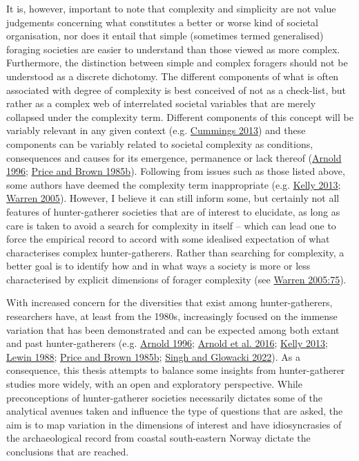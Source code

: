 \documentclass[
  12pt,
  a4paper,
  oneside]{book}
\begin{document}
It is, however, important to note that complexity and simplicity are not value judgements concerning what constitutes a \textquotesingle better\textquotesingle{} or \textquotesingle worse\textquotesingle{} kind of societal organisation, nor does it entail that simple (sometimes termed generalised) foraging societies are easier to understand than those viewed as more complex. Furthermore, the distinction between simple and complex foragers should not be understood as a discrete dichotomy. The different components of what is often associated with degree of complexity is best conceived of not as a check-list, but rather as a complex web of interrelated societal variables that are merely collapsed under the complexity term. Different components of this concept will be variably relevant in any given context (e.g. \protect\hyperlink{ref-cummings2013}{Cummings 2013}) and these components can be variably related to societal complexity as conditions, consequences and causes for its emergence, permanence or lack thereof (\protect\hyperlink{ref-arnold1996}{Arnold 1996}; \protect\hyperlink{ref-price1985a}{Price and Brown 1985b}). Following from issues such as those listed above, some authors have deemed the complexity term inappropriate (e.g. \protect\hyperlink{ref-kelly2013}{Kelly 2013}; \protect\hyperlink{ref-warren2005}{Warren 2005}). However, I believe it can still inform some, but certainly not all features of hunter-gatherer societies that are of interest to elucidate, as long as care is taken to avoid a search for complexity in itself -- which can lead one to force the empirical record to accord with some idealised expectation of what characterises complex hunter-gatherers. Rather than searching for complexity, a better goal is to identify how and in what ways a society is more or less characterised by explicit dimensions of forager complexity (see \protect\hyperlink{ref-warren2005}{Warren 2005:75}).

With increased concern for the diversities that exist among hunter-gatherers, researchers have, at least from the 1980s, increasingly focused on the immense variation that has been demonstrated and can be expected among both extant and past hunter-gatherers (e.g. \protect\hyperlink{ref-arnold1996}{Arnold 1996}; \protect\hyperlink{ref-arnold2016}{Arnold et al. 2016}; \protect\hyperlink{ref-kelly2013}{Kelly 2013}; \protect\hyperlink{ref-lewin1988}{Lewin 1988}; \protect\hyperlink{ref-price1985a}{Price and Brown 1985b}; \protect\hyperlink{ref-singh2022}{Singh and Glowacki 2022}). As a consequence, this thesis attempts to balance some insights from hunter-gatherer studies more widely, with an open and exploratory perspective. While preconceptions of hunter-gatherer societies necessarily dictates some of the analytical avenues taken and influence the type of questions that are asked, the aim is to map variation in the dimensions of interest and have idiosyncrasies of the archaeological record from coastal south-eastern Norway dictate the conclusions that are reached.
\end{document}
